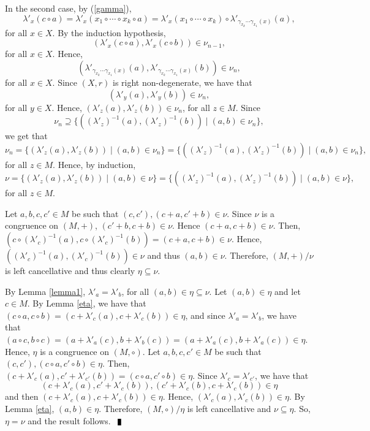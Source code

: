 \documentclass[10pt]{article}
\newenvironment{proof}{\par\noindent{\bf Proof.}}{$\qed$\par\bigskip}
\newcommand{\qed}{\enspace\vrule  height6pt  width4pt  depth2pt}
\begin{document}
\begin{proof}
	In the second case, 
	by (\ref{gamma}),
	$$\lambda'_x(c\circ a)=\lambda'_x(x_1\circ\cdots\circ x_k\circ a)=\lambda'_x(x_1\circ\cdots\circ x_k)\circ\lambda'_{\gamma_{x_k}\cdots\gamma_{x_1}(x)}(a),$$ 
	for all $x\in X$. By the induction hypothesis,
	$$(\lambda'_x(c\circ a),\lambda'_x(c\circ b))\in\nu_{n-1}, $$
	for all $x\in X$. Hence,
	$$(\lambda'_{\gamma_{x_k}\cdots\gamma_{x_1}(x)}(a),\lambda'_{\gamma_{x_k}\cdots\gamma_{x_1}(x)}(b))\in \nu_n,$$
	for all $x\in X$. Since $(X,r)$ is right non-degenerate, we have that
		$$(\lambda'_{y}(a),\lambda'_{y}(b))\in \nu_n,$$
	for all $y\in X$. Hence, $(\lambda'_{z}(a),\lambda'_{z}(b))\in \nu_n$, for all $z\in M$. Since
	$$\nu_n\supseteq \{ ( (\lambda'_z)^{-1}(a),(\lambda'_z)^{-1}(b))\mid (a,b)\in\nu_n\},$$
	we get that  
	$$\nu_n=\{ ( \lambda'_z(a),\lambda'_z(b))\mid (a,b)\in\nu_n\}= \{ ( (\lambda'_z)^{-1}(a),(\lambda'_z)^{-1}(b))\mid (a,b)\in\nu_n\},$$
for all $z\in M$. Hence, by induction, 
	$$\nu=\{ ( \lambda'_z(a),\lambda'_z(b))\mid (a,b)\in\nu\}= \{ ( (\lambda'_z)^{-1}(a),(\lambda'_z)^{-1}(b))\mid (a,b)\in\nu\},$$
for all $z\in M$.

Let $a,b,c,c'\in M$  be such that $(c,c'),(c+a,c'+b)\in \nu$. Since $\nu$ is a congruence on $(M,+)$, $(c'+b,c+b)\in\nu$. Hence $(c+a,c+b)\in \nu$. Then,
$(c\circ (\lambda'_c)^{-1}(a),c\circ (\lambda'_c)^{-1}(b))=(c+a,c+b)\in\nu$.  Hence, $( (\lambda'_c)^{-1}(a), (\lambda'_c)^{-1}(b))\in\nu$ and thus $(a,b)\in \nu$. Therefore, $(M,+)/\nu$ is left cancellative  and thus clearly  $\eta\subseteq \nu$.

By Lemma \ref{lemma1}, $\lambda'_a=\lambda'_b$, for all $(a,b)\in\eta \subseteq \nu$. Let $(a,b)\in \eta$ and let $c\in M$. By Lemma \ref{eta}, we have that
$(c\circ a,c\circ b)=(c+\lambda'_c(a),c+\lambda'_c(b))\in\eta$, and since $\lambda'_a=\lambda'_b$, we have that
$(a\circ c, b\circ c)=(a+\lambda'_a(c),b+\lambda'_b(c))=(a+\lambda'_a(c),b+\lambda'_a(c))\in\eta$. Hence, $\eta$ is a congruence on $(M,\circ)$.   Let $a,b,c,c'\in M$ be such that $(c,c'),(c\circ a,c'\circ b)\in \eta$. Then, $(c+\lambda'_c(a), c'+\lambda'_{c'}(b))=(c\circ a,c'\circ b)\in\eta$. Since $\lambda'_c=\lambda'_{c'}$, we have that
$$(c+\lambda'_c(a), c'+\lambda'_{c}(b)), (c'+\lambda'_c(b), c+\lambda'_{c}(b))\in\eta$$	
and then $(c+\lambda'_c(a), c+\lambda'_{c}(b))\in\eta$.
Hence,
$(\lambda'_c(a),\lambda'_c(b))\in \eta$. By Lemma \ref{eta}, $(a,b)\in \eta$. Therefore, $(M,\circ)/\eta$ is left cancellative and
$\nu\subseteq\eta$. So, $\eta=\nu$ and the result follows. 	
\end{proof}
\end{document}
